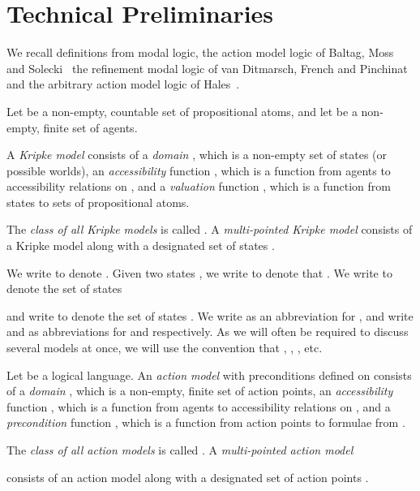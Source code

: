 \documentclass[twoside]{aiml14}
\begin{document}
  \section{Technical Preliminaries}\label{technical-preliminaries}

  We recall definitions from modal logic, the action model logic of Baltag,
  Moss and Solecki~\cite{baltag1998,baltag2005} the refinement modal logic of
  van Ditmarsch, French and Pinchinat~\cite{vanditmarsch2009,vanditmarsch2010}
  and the arbitrary action model logic of Hales~\cite{hales2013}.

  Let \atoms{} be a non-empty, countable set of propositional atoms, and let
  \agents{} be a non-empty, finite set of agents.

\begin{definition}\label{kripke-model}
  A {\em Kripke model}  consists of 
  a {\em domain}  \states{}, which is a non-empty set of states 
  (or possible worlds), 
  an {\em accessibility} function 
  , 
  which is a function from agents to accessibility relations on \states{}, 
  and a {\em valuation} function ,
  which is a function from states to sets of propositional atoms.

  The {\em class of all Kripke models} is called \classK{}. 
  A {\em multi-pointed Kripke model}  consists of a Kripke model \model{} along with a designated set of
  states .
  \end{definition}

  We write  to denote .
  Given two states , 
  we write  to denote that 
  . 
  We write  to denote the set of states 
  
  and write  to denote the set of states 
  .
  We write  as an abbreviation for 
  , and write 
  and  as abbreviations for 
   and 
   respectively.
  As we will often be required to discuss several models at once, we will use
  the convention that 
  ,
  ,
  ,
  etc.

  \begin{definition}\label{action-model}
  Let \lang{} be a logical language.
  An {\em action model}  with preconditions defined
  on \lang{} consists of a {\em domain} \actionStates, 
  which is a non-empty, finite set of action points, 
  an {\em accessibility} function ,
  which is a function from agents to accessibility relations on \actionStates, 
  and a {\em precondition} function ,
  which is a function from action points to formulae from \lang{}.

  The {\em class of all action models} is called \classAM{}.
  A {\em multi-pointed action model}
  
  consists of an action model  along with a designated set of
  action points .
  \end{definition}
\end{document}
